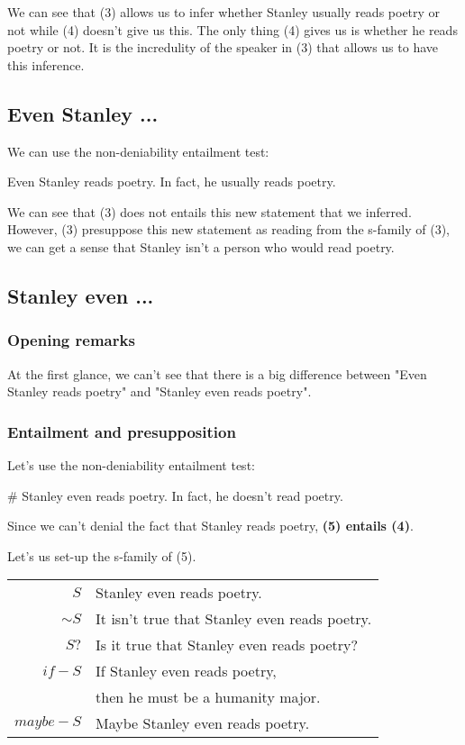 \documentclass{article}
\begin{document}
We can see that (3) allows us to infer whether Stanley usually reads poetry or not while (4) doesn't give us this. The only thing (4) gives us is whether he reads poetry or not. It is the incredulity of the speaker in (3) that allows us to have this inference.

\subsection{Even Stanley ...}

We can use the non-deniability entailment test:

Even Stanley reads poetry. In fact, he usually reads poetry. 

We can see that (3) does not entails this new statement that we inferred. However, (3) presuppose this new statement as reading from the s-family of (3), we can get a sense that Stanley isn't a person who would read poetry. 

\subsection{Stanley even ...}
\subsubsection{Opening remarks}
At the first glance, we can't see that there is a big difference between "Even Stanley reads poetry" and "Stanley even reads poetry". 
\subsubsection{Entailment and presupposition}
Let's use the non-deniability entailment test:

\# Stanley even reads poetry. In fact, he doesn't read poetry. 

Since we can't denial the fact that Stanley reads poetry, \textbf{(5) entails (4)}. 

Let's us set-up the s-family of (5).

\begin{center}
\begin{tabular}{r|l}
    $S$         & Stanley even reads poetry. \\
    $\sim S$    & It isn't true that Stanley even reads poetry. \\
    $S?$        & Is it true that Stanley even reads poetry? \\
    $if-S$      & If Stanley even reads poetry, \\
                & then he must be a humanity major. \\
    $maybe-S$   & Maybe Stanley even reads poetry. \\
\end{tabular}
\end{center}
\end{document}
